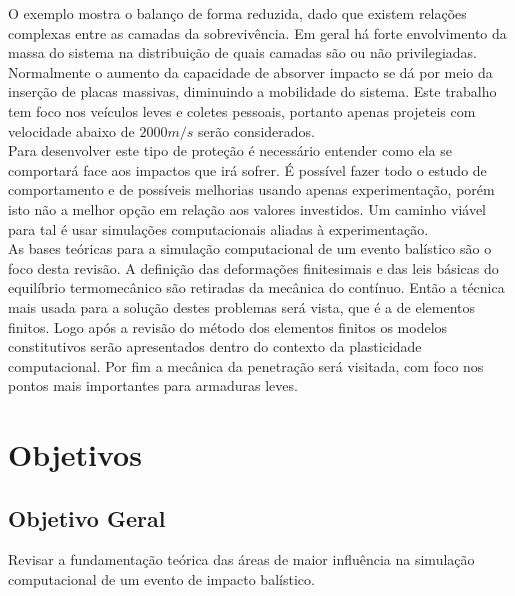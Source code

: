 O exemplo mostra o balanço de forma reduzida, dado que existem relações complexas entre as camadas da sobrevivência. Em geral há forte envolvimento da massa do sistema na distribuição de quais camadas são ou não privilegiadas. Normalmente o aumento da capacidade de absorver impacto se dá por meio da inserção de placas massivas, diminuindo a mobilidade do sistema. Este trabalho tem foco nos veículos leves e coletes pessoais, portanto apenas projeteis com velocidade abaixo de $ 2000 m/s$ serão considerados. \\

Para desenvolver este tipo de proteção é necessário entender como ela se comportará face aos impactos que irá sofrer. É possível fazer todo o estudo de comportamento e de possíveis melhorias usando apenas experimentação, porém isto não a melhor opção em relação aos valores investidos. Um caminho viável para tal é usar simulações computacionais aliadas à experimentação. \\

As bases teóricas para a simulação computacional de um evento balístico são o foco desta revisão. A definição das deformações finitesimais e das leis básicas do equilíbrio termomecânico são retiradas da mecânica do contínuo. Então a técnica mais usada para a solução destes problemas será vista, que é a de elementos finitos. Logo após a revisão do método dos elementos finitos os modelos constitutivos serão apresentados dentro do contexto da plasticidade computacional. Por fim a mecânica da penetração será visitada, com foco nos pontos mais importantes para armaduras leves.
 


\section{Objetivos}

\subsection{Objetivo Geral}

Revisar a fundamentação teórica das áreas de maior influência na simulação computacional de um evento de impacto balístico.

